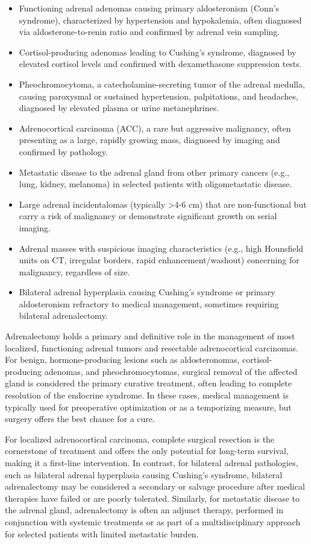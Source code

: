 \begin{itemize}
  \item Functioning adrenal adenomas causing primary aldosteronism (Conn's syndrome), characterized by hypertension and hypokalemia, often diagnosed via aldosterone-to-renin ratio and confirmed by adrenal vein sampling.
  \item Cortisol-producing adenomas leading to Cushing's syndrome, diagnosed by elevated cortisol levels and confirmed with dexamethasone suppression tests.
  \item Pheochromocytoma, a catecholamine-secreting tumor of the adrenal medulla, causing paroxysmal or sustained hypertension, palpitations, and headaches, diagnosed by elevated plasma or urine metanephrines.
  \item Adrenocortical carcinoma (ACC), a rare but aggressive malignancy, often presenting as a large, rapidly growing mass, diagnosed by imaging and confirmed by pathology.
  \item Metastatic disease to the adrenal gland from other primary cancers (e.g., lung, kidney, melanoma) in selected patients with oligometastatic disease.
  \item Large adrenal incidentalomas (typically >4-6 cm) that are non-functional but carry a risk of malignancy or demonstrate significant growth on serial imaging.
  \item Adrenal masses with suspicious imaging characteristics (e.g., high Hounsfield units on CT, irregular borders, rapid enhancement/washout) concerning for malignancy, regardless of size.
  \item Bilateral adrenal hyperplasia causing Cushing's syndrome or primary aldosteronism refractory to medical management, sometimes requiring bilateral adrenalectomy.
\end{itemize}

Adrenalectomy holds a primary and definitive role in the management of most localized, functioning adrenal tumors and resectable adrenocortical carcinomas. For benign, hormone-producing lesions such as aldosteronomas, cortisol-producing adenomas, and pheochromocytomas, surgical removal of the affected gland is considered the primary curative treatment, often leading to complete resolution of the endocrine syndrome. In these cases, medical management is typically used for preoperative optimization or as a temporizing measure, but surgery offers the best chance for a cure.

For localized adrenocortical carcinoma, complete surgical resection is the cornerstone of treatment and offers the only potential for long-term survival, making it a first-line intervention. In contrast, for bilateral adrenal pathologies, such as bilateral adrenal hyperplasia causing Cushing's syndrome, bilateral adrenalectomy may be considered a secondary or salvage procedure after medical therapies have failed or are poorly tolerated. Similarly, for metastatic disease to the adrenal gland, adrenalectomy is often an adjunct therapy, performed in conjunction with systemic treatments or as part of a multidisciplinary approach for selected patients with limited metastatic burden.

